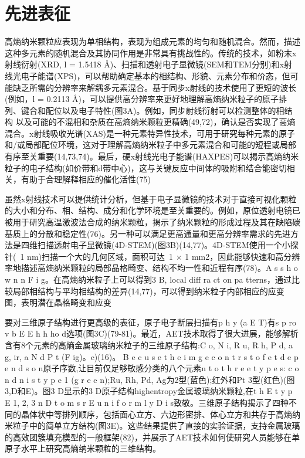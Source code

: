 \documentclass[a4paper]{article}
\begin{document}
\section*{先进表征}

高熵纳米颗粒应表现为单相结构，表现为组成元素的均匀和随机混合。然而，描述这种多元素的随机混合及其协同作用是非常具有挑战性的。传统的技术，如粉末x射线衍射(XRD, l = 1.5418 Å)、扫描和透射电子显微镜(SEM和TEM分别)和x射线光电子能谱(XPS)，可以帮助确定基本的相结构、形貌、元素分布和价态，但可能缺乏所需的分辨率来解耦多元素混合。基于同步x射线的技术使用了更短的波长(例如，l = 0.2113 Å)，可以提供高分辨率来更好地理解高熵纳米粒子的原子排列、键合和配位以及电子特性(图3A)。例如，同步射线衍射可以检测整体的相结构
以及可能的不混相和杂质在高熵纳米颗粒更精确(49,72)，确认是否实现了高熵混合。x射线吸收光谱(XAS)是一种元素特异性技术，可用于研究每种元素的原子和/或局部配位环境，这对于理解高熵纳米粒子中多元素混合和可能的短程或局部有序至关重要(14,73,74)。最后，硬x射线光电子能谱(HAXPES)可以揭示高熵纳米粒子的电子结构(如价带和d带中心)，这与关键反应中间体的吸附和结合能密切相关，有助于合理解释相应的催化活性(75)

虽然x射线技术可以提供统计分析，但基于电子显微镜的技术对于直接可视化颗粒的大小和分布、相、结构、成分和化学环境是至关重要的。例如，原位透射电镜已被用于研究高温激波法合成的纳米颗粒，揭示了纳米颗粒的形成过程及其在缺陷碳基质上的分散和稳定性(76)。另一种可以满足更高通量和更高分辨率需求的先进方法是四维扫描透射电子显微镜(4D-STEM)(图3B)(14,77)。4D-STEM使用一个小探针(~1 nm)扫描一个大的几何区域，面积可达~1 × 1 mm2，因此能够快速和高分辨率地描述高熵纳米颗粒的局部晶格畸变、结构不均一性和近程有序(78)。A s s h o w n n F i g。在高熵纳米粒子上可以得到3 B, local diff ra ct on pa tterns，通过比较局部相结构与平均相结构的差异(14,77)，可以得到纳米粒子内部相应的应变图，表明潜在晶格畸变和应变


要对三维原子结构进行更高级的表征，原子电子断层扫描有p h y (a E T)有s p ro v b E E h h ho d选项(图3C)(79-81)。最近，AET技术取得了很大进展，能够解析含有8个元素的高熵金属玻璃纳米粒子的三维原子结构:C o, N i, R u, R h, P d, a g, ir, a N d P t (F ig)。c)(16)。
B e c u s e t h e i m g e c o n t r s t o f e t d e p e n d s o n原子序数,让目前仅足够敏感分类的八个元素n t o t h r e e t y p e s: c o n d n i s t y p e 1 (g r e e n);Ru, Rh, Pd, Ag为2型(蓝色);红外和Pt 3型(红色)(图3,D和E)。图3 D显示的3 D原子结构highentropy金属玻璃纳米颗粒,在t h E t y p E 1, 2, 3 n D t o m s r E u n i f o r m l y D i s致敬。三维原子结构揭示了四种不同的晶体状中等排列顺序，包括面心立方、六边形密排、体心立方和共存于高熵纳米粒子中的简单立方结构(图3E)。这些结果提供了直接的实验证据，支持金属玻璃的高效团簇填充模型的一般框架(82)，并展示了AET技术如何使研究人员能够在单原子水平上研究高熵纳米颗粒的三维结构。
\end{document}
